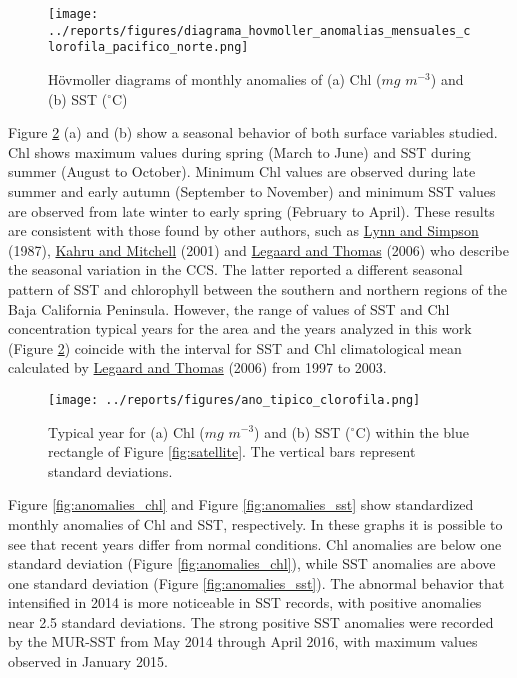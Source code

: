 \documentclass{article} %
\begin{document}
\begin{figure}
  \begin{center}
  \texttt{[image: ../reports/figures/diagrama\_hovmoller\_anomalias\_mensuales\_clorofila\_pacifico\_norte.png]}
  \caption{Hövmoller diagrams of monthly anomalies of (a) Chl ($mg$ $m^{-3}$) and (b) SST ($^{\circ}$C)}
  \label{fig:diagram}
  \end{center}
\end{figure}

Figure \ref{fig:typical} (a) and (b) show a seasonal behavior of both surface variables studied. Chl shows maximum values during spring (March to June) and SST during summer (August to October). Minimum Chl values are observed during late summer and early autumn (September to November) and minimum SST values are observed from late winter to early spring (February to April). These results are consistent with those found by other authors, such as \hyperlink{lynn}{Lynn and Simpson} (1987), \hyperlink{kahru}{Kahru and Mitchell} (2001) and \hyperlink{legaard}{Legaard and Thomas} (2006) who describe the seasonal variation in the CCS. The latter reported a different seasonal pattern of SST and chlorophyll between the southern and northern regions of the Baja California Peninsula. However, the range of values of SST and Chl concentration typical years for the area and the years analyzed in this work (Figure \ref{fig:typical}) coincide with the interval for SST and Chl climatological mean calculated by \hyperlink{legaard}{Legaard and Thomas} (2006) from 1997 to 2003.

\begin{figure}
  \begin{center}
  \texttt{[image: ../reports/figures/ano\_tipico\_clorofila.png]}
  \caption{Typical year for (a) Chl ($mg$ $m^{-3}$) and (b) SST ($^{\circ}$C) within the blue rectangle of Figure \ref{fig:satellite}. The vertical bars represent standard deviations.}
  \label{fig:typical}
  \end{center}
\end{figure}


Figure \ref{fig:anomalies_chl} and Figure \ref{fig:anomalies_sst} show standardized monthly anomalies of Chl and SST, respectively. In these graphs it is possible to see that recent years differ from normal conditions. Chl anomalies are below one standard deviation (Figure \ref{fig:anomalies_chl}), while SST anomalies are above one standard deviation (Figure \ref{fig:anomalies_sst}). The abnormal behavior that intensified in 2014 is more noticeable in SST records, with positive anomalies near 2.5 standard deviations. The strong positive SST anomalies were recorded by the MUR-SST from May 2014 through April 2016, with maximum values observed in January 2015.\\
\end{document}
